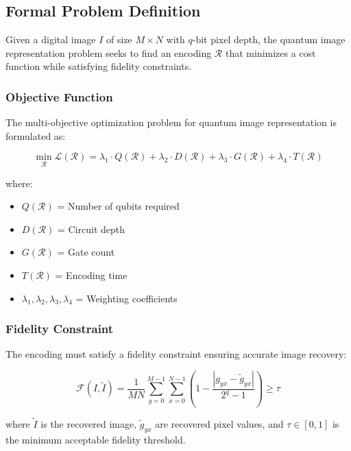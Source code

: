 \documentclass{ipol}
\begin{document}
\subsection{Formal Problem Definition}

Given a digital image $I$ of size $M \times N$ with $q$-bit pixel depth, the quantum image representation problem seeks to find an encoding $\mathcal{R}$ that minimizes a cost function while satisfying fidelity constraints.

\subsubsection{Objective Function}

The multi-objective optimization problem for quantum image representation is formulated as:

\begin{equation}
\min_{\mathcal{R}} \mathcal{L}(\mathcal{R}) = \lambda_1 \cdot Q(\mathcal{R}) + \lambda_2 \cdot D(\mathcal{R}) + \lambda_3 \cdot G(\mathcal{R}) + \lambda_4 \cdot T(\mathcal{R})
\label{eq:objective}
\end{equation}

where:
\begin{itemize}
\item $Q(\mathcal{R})$ = Number of qubits required
\item $D(\mathcal{R})$ = Circuit depth
\item $G(\mathcal{R})$ = Gate count
\item $T(\mathcal{R})$ = Encoding time
\item $\lambda_1, \lambda_2, \lambda_3, \lambda_4$ = Weighting coefficients
\end{itemize}

\subsubsection{Fidelity Constraint}

The encoding must satisfy a fidelity constraint ensuring accurate image recovery:

\begin{equation}
\mathcal{F}(I, \tilde{I}) = \frac{1}{MN} \sum_{y=0}^{M-1} \sum_{x=0}^{N-1} \left(1 - \frac{|g_{yx} - \tilde{g}_{yx}|}{2^q - 1}\right) \geq \tau
\label{eq:fidelity}
\end{equation}

where $\tilde{I}$ is the recovered image, $\tilde{g}_{yx}$ are recovered pixel values, and $\tau \in [0, 1]$ is the minimum acceptable fidelity threshold.
\end{document}
